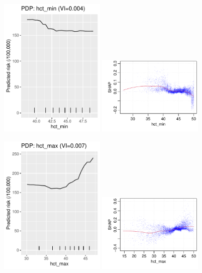 \documentclass[12pt]{article}
\begin{document}
\begin{figure}[h]
\centering
\includegraphics[width=0.45\textwidth]{figures/pdp/hct_min.pdf}
\includegraphics[width=0.45\textwidth]{figures/shap/hct_min.pdf}
\end{figure}
\begin{figure}[h]
\centering
\includegraphics[width=0.45\textwidth]{figures/pdp/hct_max.pdf}
\includegraphics[width=0.45\textwidth]{figures/shap/hct_max.pdf}
\end{figure}
\end{document}
